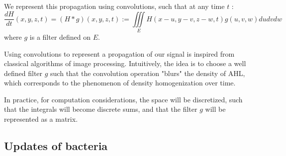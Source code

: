 \documentclass[a4paper]{article}
\theoremstyle{definition}
\begin{document}
We represent this propagation using convolutions, such that at any time $t$ :
\begin{equation}
\frac{dH}{dt}(x,y,z,t) = (H * g)(x,y,z,t) := \iiint \limits_E H(x-u,y-v,z-w,t)g(u,v,w) du dv dw
\end{equation}
where $g$ is a filter defined on $E$.

Using convolutions to represent a propagation of our signal is inspired from classical algorithms of image processing. Intuitively, the idea is to choose a well defined filter $g$ such that the convolution operation "blurs" the density of AHL, which corresponds to the phenomenon of density homogenization over time.

In practice, for computation considerations, the space will be discretized, such that the integrals will become discrete sums, and that the filter $g$ will be represented as a matrix.



\subsection{Updates of bacteria}
\end{document}
